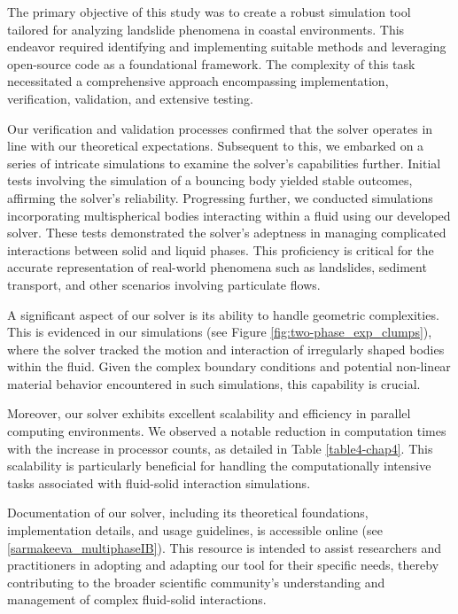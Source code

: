 The primary objective of this study was to create a robust simulation tool tailored for analyzing landslide phenomena in coastal environments. This endeavor required identifying and implementing suitable methods and leveraging open-source code as a foundational framework. The complexity of this task necessitated a comprehensive approach encompassing implementation, verification, validation, and extensive testing.

Our verification and validation processes confirmed that the solver operates in line with our theoretical expectations. Subsequent to this, we embarked on a series of intricate simulations to examine the solver's capabilities further. Initial tests involving the simulation of a bouncing body yielded stable outcomes, affirming the solver's reliability. Progressing further, we conducted simulations incorporating multispherical bodies interacting within a fluid using our developed solver. These tests demonstrated the solver's adeptness in managing complicated interactions between solid and liquid phases. This proficiency is critical for the accurate representation of real-world phenomena such as landslides, sediment transport, and other scenarios involving particulate flows.

A significant aspect of our solver is its ability to handle geometric complexities. This is evidenced in our simulations (see Figure \ref{fig:two-phase_exp_clumps}), where the solver tracked the motion and interaction of irregularly shaped bodies within the fluid. Given the complex boundary conditions and potential non-linear material behavior encountered in such simulations, this capability is crucial.

Moreover, our solver exhibits excellent scalability and efficiency in parallel computing environments. We observed a notable reduction in computation times with the increase in processor counts, as detailed in Table \ref{table4-chap4}. This scalability is particularly beneficial for handling the computationally intensive tasks associated with fluid-solid interaction simulations.

Documentation of our solver, including its theoretical foundations, implementation details, and usage guidelines, is accessible online (see \ref{sarmakeeva_multiphaseIB}). This resource is intended to assist researchers and practitioners in adopting and adapting our tool for their specific needs, thereby contributing to the broader scientific community's understanding and management of complex fluid-solid interactions.

 





